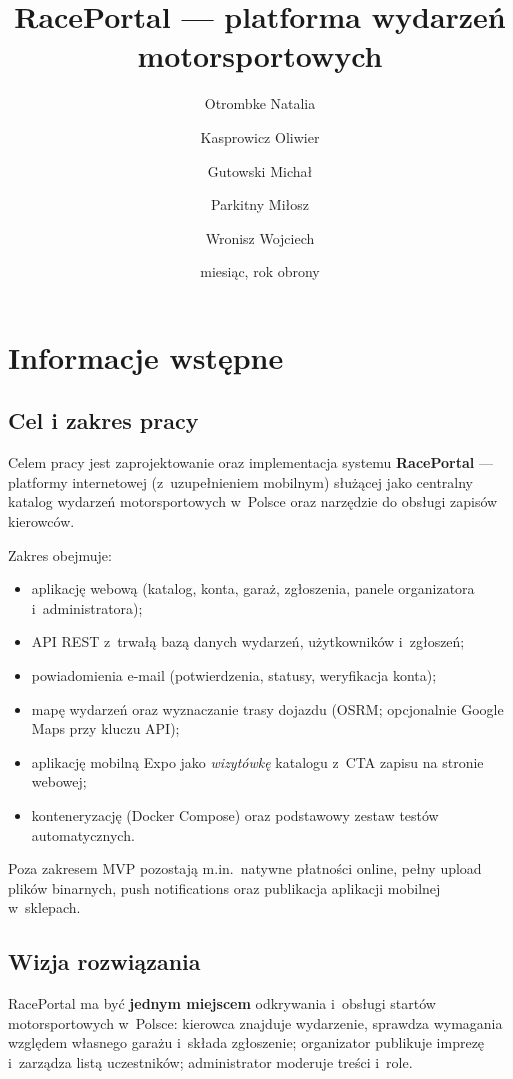 \documentclass{sprz}
\title{RacePortal --- platforma wydarzeń motorsportowych}
\author{Otrombke Natalia}{s26828}{Cyberbezpieczeństwo}{Stacjonarny}
\author{Kasprowicz Oliwier}{s30290}{Cyberbezpieczeństwo}{Stacjonarny}
\author{Gutowski Michał}{s30572}{Cyberbezpieczeństwo}{Stacjonarny}
\author{Parkitny Miłosz}{s30287}{Cyberbezpieczeństwo}{Stacjonarny}
\author{Wronisz Wojciech}{s26999}{Cyberbezpieczeństwo}{Stacjonarny}
\date{miesiąc, rok obrony} %
\begin{document}
  
  
\maketitle  
  
\makeprojectcard  
  
\makedeclarationsai  
  
\tableofcontents  
  
\chapter{Informacje wstępne}  
\section{Cel i zakres pracy}  
Celem pracy jest zaprojektowanie oraz implementacja systemu \textbf{RacePortal} --- platformy internetowej (z~uzupełnieniem mobilnym) służącej jako centralny katalog wydarzeń motorsportowych w~Polsce oraz narzędzie do obsługi zapisów kierowców.  
  
Zakres obejmuje:  
\begin{itemize}  
 \item aplikację webową (katalog, konta, garaż, zgłoszenia, panele organizatora i~administratora);  
 \item API REST z~trwałą bazą danych wydarzeń, użytkowników i~zgłoszeń;  
 \item powiadomienia e-mail (potwierdzenia, statusy, weryfikacja konta);  
 \item mapę wydarzeń oraz wyznaczanie trasy dojazdu (OSRM; opcjonalnie Google Maps przy kluczu API);  
 \item aplikację mobilną Expo jako \emph{wizytówkę} katalogu z~CTA zapisu na stronie webowej;  
 \item konteneryzację (Docker Compose) oraz podstawowy zestaw testów automatycznych.  
\end{itemize}  
  
Poza zakresem MVP pozostają m.in.\ natywne płatności online, pełny upload plików binarnych, push notifications oraz publikacja aplikacji mobilnej w~sklepach.  
  
\section{Wizja rozwiązania}  
\label{sec:wizja}  
RacePortal ma być \textbf{jednym miejscem} odkrywania i~obsługi startów motorsportowych w~Polsce: kierowca znajduje wydarzenie, sprawdza wymagania względem własnego garażu i~składa zgłoszenie; organizator publikuje imprezę i~zarządza listą uczestników; administrator moderuje treści i~role.  
  
\end{document}
